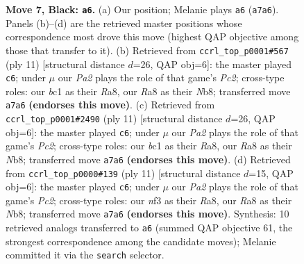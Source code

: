 \documentclass[11pt]{article}
\begin{document}
\begin{figure}[p]
\caption{\textbf{Move 7, Black: \texttt{a6}.} (a) Our position; Melanie plays \texttt{a6} (\texttt{a7a6}). Panels (b)--(d) are the retrieved master positions whose correspondence most drove this move (highest QAP objective among those that transfer to it). (b) Retrieved from \texttt{ccrl\_top\_p0001\#567} (ply 11) [structural distance $d$=26, QAP obj=6]: the master played \texttt{c6}; under $\mu$ our \emph{Pa2} plays the role of that game's \emph{Pc2}; cross-type roles: our \emph{b}c1 as their \emph{R}a8, our \emph{R}a8 as their \emph{N}b8; transferred move \texttt{a7a6} \textbf{(endorses this move)}. (c) Retrieved from \texttt{ccrl\_top\_p0001\#2490} (ply 11) [structural distance $d$=26, QAP obj=6]: the master played \texttt{c6}; under $\mu$ our \emph{Pa2} plays the role of that game's \emph{Pc2}; cross-type roles: our \emph{b}c1 as their \emph{R}a8, our \emph{R}a8 as their \emph{N}b8; transferred move \texttt{a7a6} \textbf{(endorses this move)}. (d) Retrieved from \texttt{ccrl\_top\_p0000\#139} (ply 11) [structural distance $d$=15, QAP obj=6]: the master played \texttt{c6}; under $\mu$ our \emph{Pa2} plays the role of that game's \emph{Pc2}; cross-type roles: our \emph{n}f3 as their \emph{R}a8, our \emph{R}a8 as their \emph{N}b8; transferred move \texttt{a7a6} \textbf{(endorses this move)}. Synthesis: 10 retrieved analogs transferred to \texttt{a6} (summed QAP objective 61, the strongest correspondence among the candidate moves); Melanie committed it via the \texttt{search} selector.}
\label{fig:thought-m13}
\end{figure}

\clearpage
\end{document}
